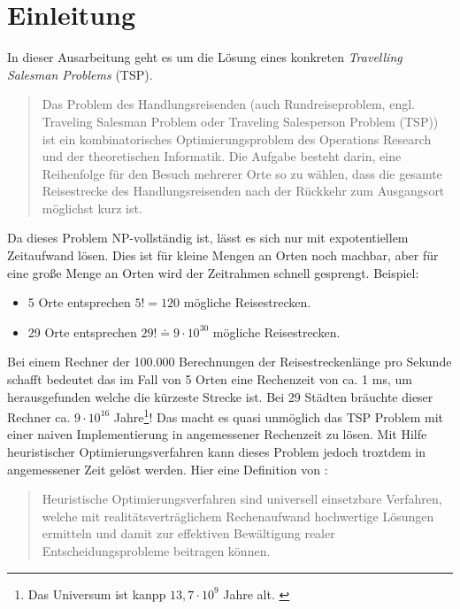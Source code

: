 \section{Einleitung}

In dieser Ausarbeitung geht es um die Lösung eines konkreten
\emph{Travelling Salesman Problems} (TSP).

\begin{quote}
Das Problem des Handlungsreisenden (auch Rundreiseproblem, engl.
Traveling Salesman Problem oder Traveling Salesperson Problem (TSP))
ist ein kombinatorisches Optimierungsproblem des Operations Research und
der theoretischen Informatik. Die Aufgabe besteht darin, eine Reihenfolge
für den Besuch mehrerer Orte so zu wählen, dass die gesamte Reisestrecke
des Handlungsreisenden nach der Rückkehr zum Ausgangsort möglichst
kurz ist. \citep{wikiTsp}
\end{quote}

\noindent Da dieses Problem NP-vollständig ist, lässt es sich nur mit
expotentiellem Zeitaufwand lösen.
Dies ist für kleine Mengen an Orten noch machbar, aber für eine große
Menge an Orten wird der Zeitrahmen schnell gesprengt.
Beispiel:

\begin{itemize}
  \item 5 Orte entsprechen $5! = 120$ mögliche Reisestrecken.
  \item 29 Orte entsprechen $29! \doteq 9 \cdot 10^{30}$ mögliche Reisestrecken.
\end{itemize}

\noindent Bei einem Rechner der 100.000 Berechnungen der Reisestreckenlänge pro
Sekunde schafft bedeutet das im Fall von 5 Orten eine Rechenzeit
von ca. 1 ms, um herausgefunden welche die kürzeste Strecke ist.
Bei 29 Städten bräuchte dieser Rechner ca. $9 \cdot 10^{16}$
Jahre\footnote{Das Universum ist
kanpp $13,7 \cdot 10^{9}$ Jahre alt. \citep[siehe][]{wikiUniversum}}!
Das macht es quasi unmöglich das TSP Problem mit einer naiven Implementierung
in angemessener Rechenzeit zu lösen.
Mit Hilfe heuristischer Optimierungsverfahren kann dieses Problem
jedoch troztdem in angemessener Zeit gelöst werden. Hier eine Definition
von \citep{fink}:

\begin{quote}
Heuristische Optimierungsverfahren sind universell einsetzbare Verfahren,
welche mit realitätsverträglichem Rechenaufwand hochwertige Lösungen
ermitteln und damit zur effektiven Bewältigung realer Entscheidungsprobleme
beitragen können. \citep[S.~1]{fink}
\end{quote}

